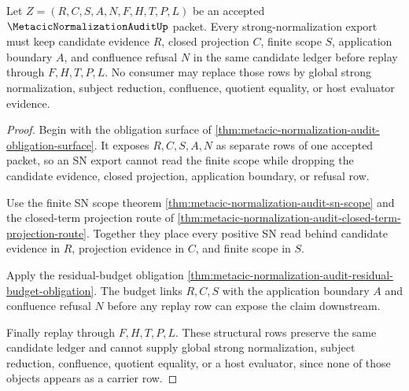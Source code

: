 \begin{theorem}
\label{thm:metacic-normalization-audit-candidate-ledger-locality}
Let $Z=(R,C,S,A,N,F,H,T,P,L)$ be an accepted $\MetacicNormalizationAuditUp$ packet. Every strong-normalization export must keep candidate evidence $R$, closed projection $C$, finite scope $S$, application boundary $A$, and confluence refusal $N$ in the same candidate ledger before replay through $F,H,T,P,L$. No consumer may replace those rows by global strong normalization, subject reduction, confluence, quotient equality, or host evaluator evidence.
\end{theorem}
\begin{proof}
Begin with the obligation surface of \autoref{thm:metacic-normalization-audit-obligation-surface}. It exposes $R,C,S,A,N$ as separate rows of one accepted packet, so an SN export cannot read the finite scope while dropping the candidate evidence, closed projection, application boundary, or refusal row.

Use the finite SN scope theorem \autoref{thm:metacic-normalization-audit-sn-scope} and the closed-term projection route of \autoref{thm:metacic-normalization-audit-closed-term-projection-route}. Together they place every positive SN read behind candidate evidence in $R$, projection evidence in $C$, and finite scope in $S$.

Apply the residual-budget obligation \autoref{thm:metacic-normalization-audit-residual-budget-obligation}. The budget links $R,C,S$ with the application boundary $A$ and confluence refusal $N$ before any replay row can expose the claim downstream.

Finally replay through $F,H,T,P,L$. These structural rows preserve the same candidate ledger and cannot supply global strong normalization, subject reduction, confluence, quotient equality, or a host evaluator, since none of those objects appears as a carrier row.
\end{proof}

